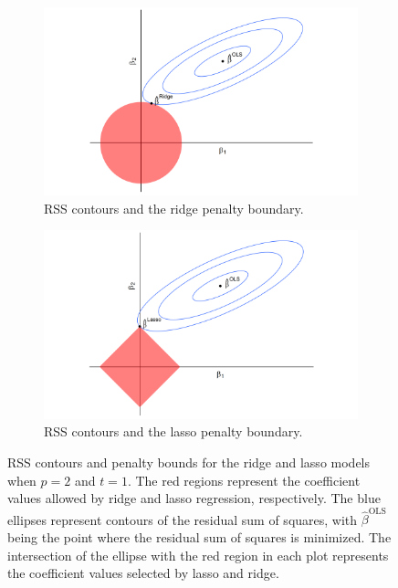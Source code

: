 \documentclass{article}
\begin{document}
	\begin{figure}[!b]
		\centering
		\begin{subfigure}[b]{0.45\textwidth}
			\includegraphics[width=\textwidth]{images/ridge-diagram.png}
			\captionsetup{width = 0.8\textwidth}
			\caption{RSS contours and the ridge penalty boundary.}
			\label{fig:ridge-diagram}
		\end{subfigure}
		\hspace{30pt}
		\begin{subfigure}[b]{0.45\textwidth}
			\includegraphics[width=\textwidth]{images/lasso-diagram.png}
			\captionsetup{width = 0.8\textwidth}
			\caption{RSS contours and the lasso penalty boundary.}
			\label{fig:lasso-diagram}
		\end{subfigure}
		\captionsetup{width = 0.9\textwidth}
		\caption{RSS contours and penalty bounds for the ridge and lasso models when $p=2$ and $t = 1$. The red regions represent the coefficient values allowed by ridge and lasso regression, respectively. The blue ellipses represent contours of the residual sum of squares, with $\hat{\beta}^{\text{OLS}}$ being the point where the residual sum of squares is minimized. The intersection of the ellipse with the red region in each plot represents the coefficient values selected by lasso and ridge.}
		\label{fig:ridge-lasso-diagram}
	\end{figure}
	
\end{document}
